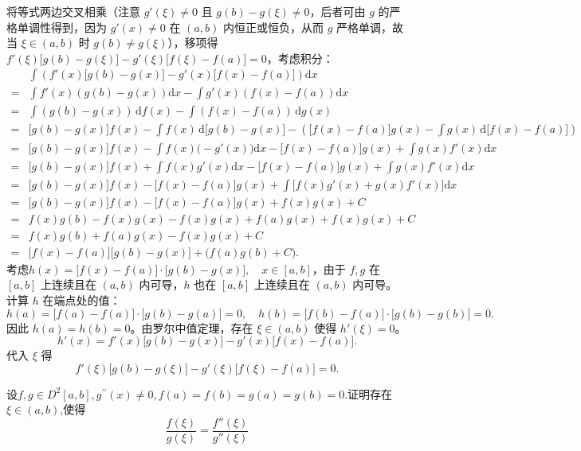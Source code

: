 \begin{solution}
将等式两边交叉相乘（注意 $g'(\xi)\neq0$ 且 $g(b)-g(\xi)\neq0$，后者可由 $g$ 的严格单调性得到，因为 $g'(x)\neq0$ 在 $(a,b)$ 内恒正或恒负，从而 $g$ 严格单调，故当 $\xi\in(a,b)$ 时 $g(b)\neq g(\xi)$），移项得
$f'(\xi)\bigl[g(b)-g(\xi)\bigr]-g'(\xi)\bigl[f(\xi)-f(a)\bigr]=0$，考虑积分：
\begin{align*}
&\int \left(f'(x)\bigl[g(b)-g(x)\bigr]-g'(x)\bigl[f(x)-f(a)\bigr]\right)\mathrm{d}x \\
=&\int f'(x)(g(b)-g(x))\mathrm{d}x-\int g'(x)(f(x)-f(a))\mathrm{d}x \\
=&\int (g(b)-g(x))\,\mathrm{d}f(x)-\int (f(x)-f(a))\,\mathrm{d}g(x) \\
=&\bigl[g(b)-g(x)\bigr]f(x)-\int f(x)\,\mathrm{d}\bigl[g(b)-g(x)\bigr]-\left(\bigl[f(x)-f(a)\bigr]g(x)-\int g(x)\,\mathrm{d}\bigl[f(x)-f(a)\bigr]\right) \\
=&\bigl[g(b)-g(x)\bigr]f(x)-\int f(x)\bigl(-g'(x)\bigr)\mathrm{d}x-\bigl[f(x)-f(a)\bigr]g(x)+\int g(x)f'(x)\mathrm{d}x \\
=&\bigl[g(b)-g(x)\bigr]f(x)+\int f(x)g'(x)\mathrm{d}x-\bigl[f(x)-f(a)\bigr]g(x)+\int g(x)f'(x)\mathrm{d}x \\
=&\bigl[g(b)-g(x)\bigr]f(x)-\bigl[f(x)-f(a)\bigr]g(x)+\int\bigl[f(x)g'(x)+g(x)f'(x)\bigr]\mathrm{d}x \\
=&\bigl[g(b)-g(x)\bigr]f(x)-\bigl[f(x)-f(a)\bigr]g(x)+f(x)g(x)+C \\
=&f(x)g(b)-f(x)g(x)-f(x)g(x)+f(a)g(x)+f(x)g(x)+C \\
=&f(x)g(b)+f(a)g(x)-f(x)g(x)+C \\
=&\bigl[f(x)-f(a)\bigr]\bigl[g(b)-g(x)\bigr]+\bigl(f(a)g(b)+C\bigr).
\end{align*}
考虑$h(x)=\bigl[f(x)-f(a)\bigr]\cdot\bigl[g(b)-g(x)\bigr],\quad x\in[a,b]$，由于 $f,g$ 在 $[a,b]$ 上连续且在 $(a,b)$ 内可导，$h$ 也在 $[a,b]$ 上连续且在 $(a,b)$ 内可导。计算 $h$ 在端点处的值：
\[
h(a)=\bigl[f(a)-f(a)\bigr]\cdot\bigl[g(b)-g(a)\bigr]=0,\quad 
h(b)=\bigl[f(b)-f(a)\bigr]\cdot\bigl[g(b)-g(b)\bigr]=0.
\]
因此 $h(a)=h(b)=0$。由罗尔中值定理，存在 $\xi\in(a,b)$ 使得 $h'(\xi)=0$。
\[
h'(x)=f'(x)\bigl[g(b)-g(x)\bigr]-g'(x)\bigl[f(x)-f(a)\bigr].
\]
代入 $\xi$ 得
\[
f'(\xi)\bigl[g(b)-g(\xi)\bigr]-g'(\xi)\bigl[f(\xi)-f(a)\bigr]=0.
\]
\end{solution}
\newpage
\begin{example}[$\frac{f\left(\xi\right)}{g\left(\xi\right)}=\frac{f''\left(\xi\right)}{g''\left(\xi\right)}$]
设$f,g\in D^{2}\left[a,b\right],g^{\prime\prime}\left(x\right)\neq0,f\left(a\right)=f\left(b\right)=g\left(a\right)=g\left(b\right)=0.$证明存在$\xi\in(a,b)$,使得
$$\frac{f\left(\xi\right)}{g\left(\xi\right)}=\frac{f''\left(\xi\right)}{g''\left(\xi\right)}$$
\end{example}
